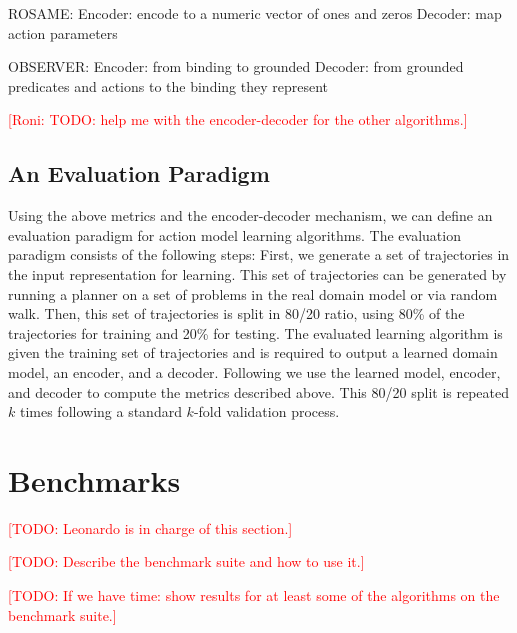 \documentclass{article}
\theoremstyle{definition}
\theoremstyle{remark}
\newcommand{\todo}[1]{{\textcolor{red}{[TODO: #1]}}}
\newcommand{\roni}[1]{{\textcolor{red}{[Roni: #1]}}}
\begin{document}
ROSAME:
Encoder: encode to a numeric vector of ones and zeros
Decoder: map action parameters

OBSERVER: 
Encoder: from binding to grounded
Decoder: from grounded predicates and actions to the binding they represent

\roni{TODO: help me with the encoder-decoder for the other algorithms.}


\subsection{An Evaluation Paradigm}
Using the above metrics and the encoder-decoder mechanism, we can define an evaluation paradigm for action model learning algorithms.
The evaluation paradigm consists of the following steps: 
First, we generate a set of trajectories in the input representation for learning. 
This set of trajectories can be generated by running a planner on a set of problems in the real domain model or via random walk.
Then, this set of trajectories is split in 80/20 ratio, using 80\% of the trajectories for training and 20\% for testing. 
The evaluated learning algorithm is given the training set of trajectories and is required to output a learned domain model, an encoder, and a decoder. 
Following we use the learned model, encoder, and decoder to compute the metrics described above. 
This 80/20 split is repeated $k$ times following a standard $k$-fold validation process. 









\section{Benchmarks}

\todo{Leonardo is in charge of this section.}

\todo{Describe the benchmark suite and how to use it.}

\todo{If we have time: show results for at least some of the algorithms on the benchmark suite.}
\end{document}
